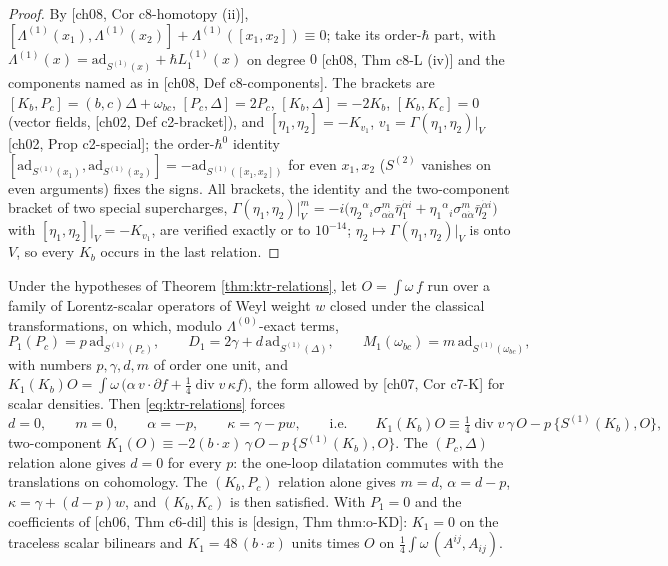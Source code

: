 \begin{proof}
By [ch08, Cor c8-homotopy (ii)], $[\Lambda^{(1)}(x_1),\Lambda^{(1)}(x_2)]+\Lambda^{(1)}([x_1,x_2])\equiv0$; take its order-$\hbar$ part, with $\Lambda^{(1)}(x)=\mathrm{ad}_{S^{(1)}(x)}+\hbar L_1^{(1)}(x)$ on degree $0$ [ch08, Thm c8-L (iv)] and the components named as in [ch08, Def c8-components]. The brackets are $[K_b,P_c]=(b,c)\Delta+\omega_{bc}$, $[P_c,\Delta]=2P_c$, $[K_b,\Delta]=-2K_b$, $[K_b,K_c]=0$ (vector fields, [ch02, Def c2-bracket]), and $[\eta_1,\eta_2]=-K_{v_1}$, $v_1=\Gamma(\eta_1,\eta_2)|_V$ [ch02, Prop c2-special]; the order-$\hbar^0$ identity $[\mathrm{ad}_{S^{(1)}(x_1)},\mathrm{ad}_{S^{(1)}(x_2)}]=-\mathrm{ad}_{S^{(1)}([x_1,x_2])}$ for even $x_1,x_2$ ($S^{(2)}$ vanishes on even arguments) fixes the signs. All brackets, the identity and the two-component bracket of two special supercharges, $\Gamma(\eta_1,\eta_2)|_V^m=-i\big(\eta_2{}^\alpha{}_i\sigma^m_{\alpha\dot\alpha}\bar\eta_1^{\dot\alpha i}+\eta_1{}^\alpha{}_i\sigma^m_{\alpha\dot\alpha}\bar\eta_2^{\dot\alpha i}\big)$ with $[\eta_1,\eta_2]|_V=-K_{v_1}$, are verified exactly or to $10^{-14}$; $\eta_2\mapsto\Gamma(\eta_1,\eta_2)|_V$ is onto $V$, so every $K_b$ occurs in the last relation.
\end{proof}

\begin{theorem}
\label{thm:ktr-KD}
Under the hypotheses of Theorem \ref{thm:ktr-relations}, let $O=\int\omega\,f$ run over a family of Lorentz-scalar operators of Weyl weight $w$ closed under the classical transformations, on which, modulo $\Lambda^{(0)}$-exact terms,
\[
P_1(P_c)=p\,\mathrm{ad}_{S^{(1)}(P_c)},\qquad D_1=2\gamma+d\,\mathrm{ad}_{S^{(1)}(\Delta)},\qquad M_1(\omega_{bc})=m\,\mathrm{ad}_{S^{(1)}(\omega_{bc})},
\]
with numbers $p,\gamma,d,m$ of order one unit, and $K_1(K_b)O=\int\omega\,\big(\alpha\,v\cdot\partial f+\tfrac14\operatorname{div}v\,\kappa f\big)$, the form allowed by [ch07, Cor c7-K] for scalar densities. Then \eqref{eq:ktr-relations} forces
\[
d=0,\qquad m=0,\qquad \alpha=-p,\qquad \kappa=\gamma-pw,\qquad\text{i.e.}\qquad K_1(K_b)O\equiv\tfrac14\operatorname{div}v\,\gamma\,O-p\,\{S^{(1)}(K_b),O\},
\]
two-component $K_1(O)\equiv-2(b\cdot x)\,\gamma\,O-p\,\{S^{(1)}(K_b),O\}$. The $(P_c,\Delta)$ relation alone gives $d=0$ for every $p$: the one-loop dilatation commutes with the translations on cohomology. The $(K_b,P_c)$ relation alone gives $m=d$, $\alpha=d-p$, $\kappa=\gamma+(d-p)w$, and $(K_b,K_c)$ is then satisfied. With $P_1=0$ and the coefficients of [ch06, Thm c6-dil] this is [design, Thm thm:o-KD]: $K_1=0$ on the traceless scalar bilinears and $K_1=48\,(b\cdot x)$ units times $O$ on $\tfrac14\int\omega\,(A^{ij},A_{ij})$.
\end{theorem}

